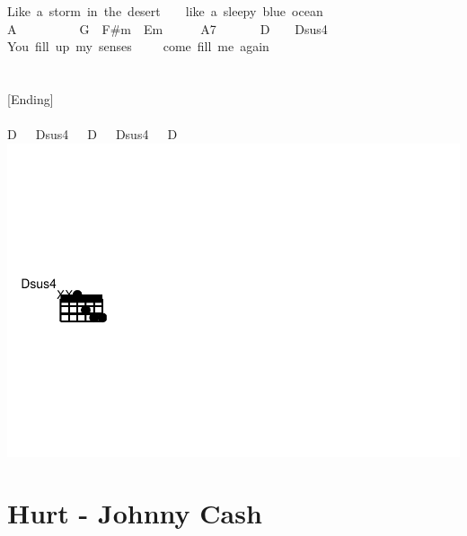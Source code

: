 \documentclass[]{book}
\let\stdsection\section
\renewcommand\section{\clearpage\stdsection}
\begin{document}
Like~a~storm~in~the~desert~~~~like~a~sleepy~blue~ocean\\
\hspace*{0.333em}\hspace*{0.333em}\hspace*{0.333em}\hspace*{0.333em}A~~~~~~~~~~G~~F\#m~~Em~~~~~~A7~~~~~~~D~~~~Dsus4\\
You~fill~up~my~senses~~~~~come~fill~me~again\\
~\\
~\\
{[}Ending{]}\\
~\\
D~~~Dsus4~~~D~~~Dsus4~~~D\\

\includegraphics{Songs_files/figure-latex/unnamed-chunk-35-1.pdf}

\hypertarget{hurt---johnny-cash}{%
\section{Hurt - Johnny Cash}\label{hurt---johnny-cash}}
\end{document}
